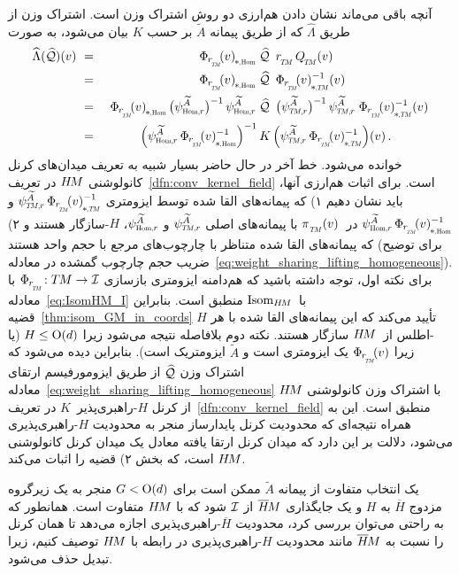 آنچه باقی می‌ماند نشان دادن هم‌ارزی دو روش اشتراک وزن است.
اشتراک وزن از طریق $\widehat{\Lambda}$ که از طریق پیمانه $\widetilde{A}$ بر حسب $K$ بیان می‌شود، به صورت
\begin{alignat}{3}\label{eq:weight_sharing_lifting_homogeneous}
	\widehat{\Lambda}(\Qhat)(v)
	\ &=&\ \dPhirHom{v}\; &\Qhat\,\ \rTM\, \QTM (v) \notag \\
	\ &=&\ \dPhirHom{v}\; &\Qhat\,\ \dPhirTM{v}^{-1}(v) \notag \\
	\ &=&\ \dPhirHom{v}\, \big(\psiHomr^{\widetilde{A}}\big)^{-1}\, \psiHomr^{\widetilde{A}}\; &\Qhat\,\ \big(\psiTMr^{\widetilde{A}}\big)^{-1}\, \psiTMr^{\widetilde{A}}\; \dPhirTM{v}^{-1}(v) \notag \\
	\ &=&\ \Big( \psiHomr^{\widetilde{A}}\, \dPhirHom{v}^{-1} \Big)^{-1}\, &K\, \Big( \psiTMr^{\widetilde{A}}\, \dPhirTM{v}^{-1} \Big)(v) \,.
\end{alignat}
خوانده می‌شود. خط آخر در حال حاضر بسیار شبیه به تعریف میدان‌های کرنل کانولوشنی $H\mkern-2.5muM$ در تعریف~\ref{dfn:conv_kernel_field} است.
برای اثبات هم‌ارزی آنها، باید نشان دهیم
۱) که پیمانه‌های القا شده توسط ایزومتری 
$\psiTMr^{\widetilde{A}}\, \dPhirTM{v}^{-1}$ و $\psiHomr^{\widetilde{A}}\, \dPhirHom{v}^{-1}$ در~$\piTM(v)$
با پیمانه‌های اصلی $\psiTMr^{\widetilde{A}}$ و $\psiHomr^{\widetilde{A}}$، $H$-سازگار هستند و
۲) که پیمانه‌های القا شده متناظر با چارچوب‌های مرجع با حجم واحد هستند (برای توضیح ضریب حجم چارچوب گمشده در معادله~\eqref{eq:weight_sharing_lifting_homogeneous}).
برای نکته اول، توجه داشته باشید که هم‌دامنه ایزومتری بازسازی $\PhirNoArg: \TM \to \I$ با معادله~\eqref{eq:IsomHM_I} با~$\operatorname{Isom}_{H\mkern-2.5muM}$ منطبق است.
بنابراین قضیه~\ref{thm:isom_GM_in_coords} تأیید می‌کند که این پیمانه‌های القا شده با هر $H$-اطلس از~$H\mkern-2.5muM$ سازگار هستند.
نکته دوم بلافاصله نتیجه می‌شود زیرا $H \leq \operatorname{O}(d)$ (یا زیرا $\Phir{v}$ یک ایزومتری است و $\widetilde{A}$ ایزومتریک است).
بنابراین دیده می‌شود که اشتراک وزن $\widehat{\mathcal{Q}}$ از طریق ایزومورفیسم ارتقای معادله~\ref{eq:weight_sharing_lifting_homogeneous} با اشتراک وزن کانولوشنی $H\mkern-2.5muM$ از کرنل $H$-راهبری‌پذیر~$K$ در تعریف~\ref{dfn:conv_kernel_field} منطبق است.
این به همراه نتیجه‌ای که محدودیت کرنل پایدارساز منجر به محدودیت $H$-راهبری‌پذیری می‌شود، دلالت بر این دارد که میدان کرنل ارتقا یافته معادل یک میدان کرنل کانولوشنی $H\mkern-2.5muM$ است، که بخش ۲) قضیه را اثبات می‌کند.







یک انتخاب متفاوت از پیمانه $\widetilde{A}$ ممکن است برای $G<\operatorname{O}(d)$ منجر به یک زیرگروه مزدوج $\overline{H}$ به $H$ و یک جایگذاری $\overline{H}\mkern-2muM$ از $\mathcal{I}$ شود که با $H\mkern-2.5muM$ متفاوت است.
همانطور که به راحتی می‌توان بررسی کرد، محدودیت $\overline{H}$-راهبری‌پذیری اجازه می‌دهد تا همان کرنل را نسبت به $\overline{H}\mkern-2muM$ مانند محدودیت $H$-راهبری‌پذیری در رابطه با $H\mkern-2.5muM$ توصیف کنیم، زیرا تبدیل حذف می‌شود.